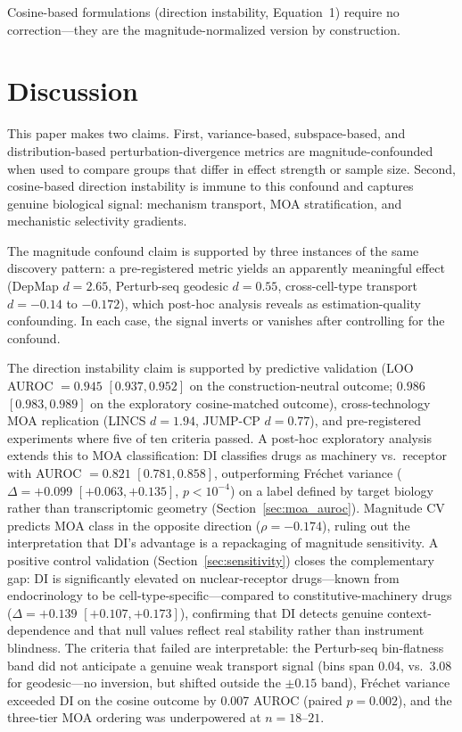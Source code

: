 \documentclass[11pt]{article}
\begin{document}
Cosine-based formulations (direction instability, Equation~1) require no
correction---they are the magnitude-normalized version by construction.


\section{Discussion}

This paper makes two claims. First, variance-based, subspace-based, and
distribution-based perturbation-divergence metrics are
magnitude-confounded when used to compare groups that differ in effect
strength or sample size. Second, cosine-based direction instability is
immune to this confound and captures genuine biological signal: mechanism
transport, MOA stratification, and mechanistic selectivity gradients.

The magnitude confound claim is supported by three instances of the same
discovery pattern: a pre-registered metric yields an apparently
meaningful effect (DepMap $d = 2.65$, Perturb-seq geodesic $d = 0.55$,
cross-cell-type transport $d = -0.14$ to $-0.172$), which post-hoc
analysis reveals as estimation-quality confounding. In each case, the
signal inverts or vanishes after controlling for the confound.

The direction instability claim is supported by predictive validation
(LOO AUROC $= 0.945$ $[0.937, 0.952]$ on the construction-neutral
outcome; $0.986$ $[0.983, 0.989]$ on the exploratory cosine-matched
outcome), cross-technology MOA replication (LINCS $d = 1.94$, JUMP-CP
$d = 0.77$), and pre-registered experiments where five of ten criteria
passed. A post-hoc exploratory analysis extends this to MOA
classification: DI classifies drugs as machinery vs.\ receptor with
AUROC $= 0.821$ $[0.781, 0.858]$, outperforming Fr\'{e}chet variance
($\Delta = +0.099$ $[+0.063, +0.135]$, $p < 10^{-4}$) on a label
defined by target biology rather than transcriptomic geometry
(Section~\ref{sec:moa_auroc}). Magnitude CV predicts MOA class in the
opposite direction ($\rho = -0.174$), ruling out the interpretation
that DI's advantage is a repackaging of magnitude sensitivity. A
positive control validation (Section~\ref{sec:sensitivity}) closes the
complementary gap: DI is significantly elevated on nuclear-receptor
drugs---known from endocrinology to be cell-type-specific---compared to
constitutive-machinery drugs ($\Delta = +0.139$ $[+0.107, +0.173]$),
confirming that DI detects genuine context-dependence and that null
values reflect real stability rather than instrument blindness. The criteria that failed are interpretable: the Perturb-seq
bin-flatness band did not anticipate a genuine weak transport signal
(bins span 0.04, vs.\ 3.08 for geodesic---no inversion, but shifted
outside the $\pm 0.15$ band), Fr\'{e}chet variance exceeded DI on the
cosine outcome by 0.007 AUROC (paired $p = 0.002$), and the three-tier
MOA ordering was underpowered at $n = 18$--$21$.
\end{document}
